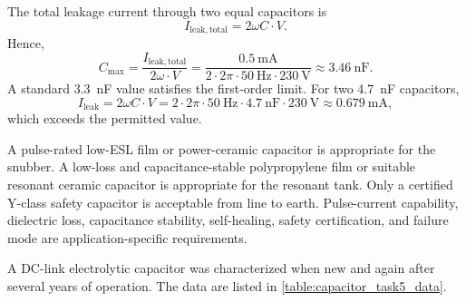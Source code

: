 
\begin{solutionblock}
    The total leakage current through two equal capacitors is
    \begin{equation}
        I_\mathrm{leak,total}=2\omega C \cdot V.
    \end{equation}
    Hence,
    \begin{equation}
        C_\mathrm{max}=\frac{I_\mathrm{leak,total}}{2\omega \cdot  V}=\frac{\SI{0.5}{\milli\ampere}}
        {2\cdot2\pi \cdot \SI{50}{\hertz}\cdot\SI{230}{\volt}}
        \approx\SI{3.46}{\nano\farad}.
    \end{equation}
    A standard \SI{3.3}{\nano\farad} value satisfies the first-order limit.
    For two \SI{4.7}{\nano\farad} capacitors,
    \begin{equation}
        I_\mathrm{leak}=2\omega C \cdot V=2 \cdot2 \pi \cdot \SI{50}{\hertz} \cdot
        \SI{4.7}{\nano\farad} \cdot \SI{230}{\volt}
        \approx\SI{0.679}{\milli\ampere},
    \end{equation}
    which exceeds the permitted value.
\end{solutionblock}


\begin{solutionblock}
    A pulse-rated low-ESL film or power-ceramic capacitor is appropriate for the
    snubber. A low-loss and capacitance-stable polypropylene film or suitable
    resonant ceramic capacitor is appropriate for the resonant tank. Only a
    certified Y-class safety capacitor is acceptable from line to earth.
    Pulse-current capability, dielectric loss, capacitance stability, self-healing,
    safety certification, and failure mode are application-specific requirements.
\end{solutionblock}




A DC-link electrolytic capacitor was characterized when new and again after
several years of operation. The data are listed in
\autoref{table:capacitor_task5_data}.


